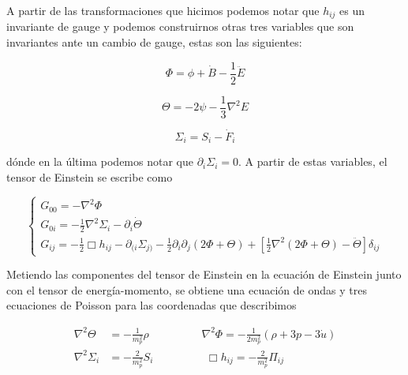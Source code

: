 A partir de las transformaciones que hicimos podemos notar que $h_{ij}$ es un invariante de gauge y podemos construirnos otras tres variables que son invariantes ante un cambio de gauge, estas son las siguientes:

\begin{equation}
    \Phi = \phi + \dot{B} - \frac{1}{2} \ddot{E}
\end{equation}

\begin{equation}
    \Theta = - 2 \psi - \frac{1}{3} \nabla^2 E
\end{equation}

\begin{equation}
    \Sigma_i = S_i - \dot{F}_i
\end{equation}

\noindent
dónde en la última podemos notar que $\partial_i \Sigma_i = 0$. A partir de estas variables, el tensor de Einstein se escribe como

\begin{equation}
    \begin{cases}
        \displaystyle G_{00} = - \nabla^2 \Phi\\
        \displaystyle G_{0i} = - \frac{1}{2} \nabla^2 \Sigma_i - \partial_i \dot{\Theta}\\
        \displaystyle G_{ij} = - \frac{1}{2} \Box h_{ij} - \partial_{(i} \Sigma_{j)} - \frac{1}{2} \partial_i \partial_j (2 \Phi + \Theta) + \left[ \frac{1}{2} \nabla^2 (2\Phi + \Theta) - \ddot{\Theta} \right] \delta_{ij}
    \end{cases}
\end{equation}

Metiendo las componentes del tensor de Einstein en la ecuación de Einstein junto con el tensor de energía-momento, se obtiene una ecuación de ondas y tres ecuaciones de Poisson para las coordenadas que describimos

\begin{equation}
    \begin{split}
        \nabla^2 \Theta &= - \frac{1}{m_p^2} \rho \hspace{2cm} \nabla^2 \Phi = - \frac{1}{2 m_p^2} \left( \rho + 3 p - 3 \dot{u} \right)\\
        \nabla^2 \Sigma_i &= - \frac{2}{m_p^2} S_i \hspace{2cm} \Box h_{ij} = - \frac{2}{m_p^2} \Pi_{ij}
    \end{split}
\end{equation}

